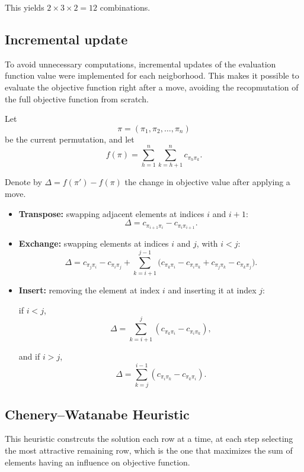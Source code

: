 This yields \(2 \times 3 \times 2 = 12\) combinations.

\subsection{Incremental update }


To avoid unnecessary computations, incremental updates of the evaluation function value were implemented for each neigborhood. This makes it possible to evaluate the objective function right after a move, avoiding the recopmutation of the full objective function from scratch.

Let
\[
\pi = (\pi_1,\pi_2,\dots,\pi_n)
\]
be the current permutation, and let
\[
f(\pi)=\sum_{h=1}^{n}\sum_{k=h+1}^{n} c_{\pi_h\pi_k}.
\]

Denote by \(\Delta = f(\pi')-f(\pi)\) the change in objective value after applying a move.

\begin{itemize}[leftmargin=1.5em]
    \item \textbf{Transpose:} swapping adjacent elements at indices \(i\) and \(i+1\):
    \[
    \Delta = c_{\pi_{i+1}\pi_i} - c_{\pi_i\pi_{i+1}}.
    \]

    \item \textbf{Exchange:} swapping elements at indices \(i\) and \(j\), with \(i<j\):
    \[
    \Delta
    =
    c_{\pi_j\pi_i}-c_{\pi_i\pi_j}
    +
    \sum_{k=i+1}^{j-1}
    \Big(
    c_{\pi_k\pi_i}-c_{\pi_i\pi_k}
    +
    c_{\pi_j\pi_k}-c_{\pi_k\pi_j}
    \Big).
    \]

    \item \textbf{Insert:} removing the element at index \(i\) and inserting it at index \(j\):
    
    if \(i<j\),
    \[
    \Delta
    =
    \sum_{k=i+1}^{j}
    \left(
    c_{\pi_k\pi_i}-c_{\pi_i\pi_k}
    \right),
    \]
    
    and if \(i>j\),
    \[
    \Delta
    =
    \sum_{k=j}^{i-1}
    \left(
    c_{\pi_i\pi_k}-c_{\pi_k\pi_i}
    \right).
    \]
\end{itemize}


\subsection{Chenery--Watanabe Heuristic}

This heuristic constrcuts the solution each row at a time, at each step selecting the most attractive remaining row, which is the one that maximizes the sum of elements having an influence on objective function.

